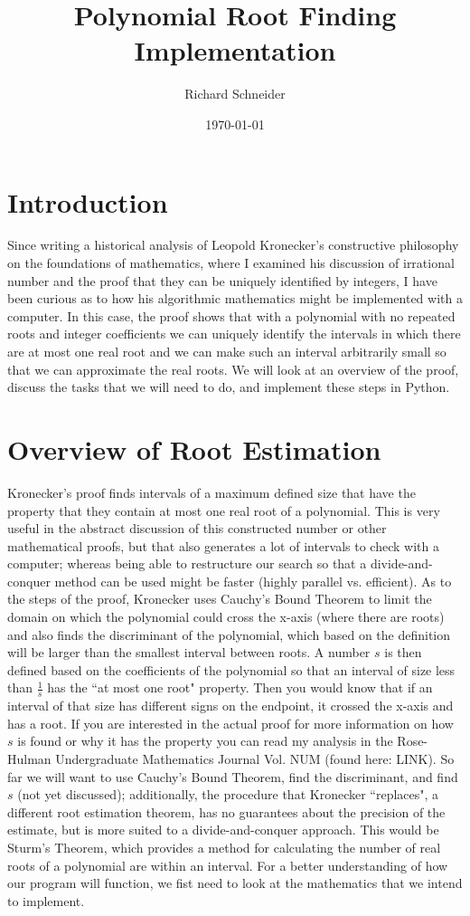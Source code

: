 \documentclass[]{article}
\title{Polynomial Root Finding Implementation}
\author{Richard Schneider}
\date{\today}
\theoremstyle{definition}
\begin{document}
\maketitle
\section{Introduction}
Since writing a historical analysis of Leopold Kronecker's constructive philosophy on the foundations of mathematics, where I examined his discussion of irrational number and the proof that they can be uniquely identified by integers, I have been curious as to how his algorithmic mathematics might be implemented with a computer. In this case, the proof shows that with a polynomial with no repeated roots and integer coefficients we can uniquely identify the intervals in which there are at most one real root and we can make such an interval arbitrarily small so that we can approximate the real roots. We will look at an overview of the proof, discuss the tasks that we will need to do, and implement these steps in Python.

\section{Overview of Root Estimation}
Kronecker's proof finds intervals of a maximum defined size that have the property that they contain at most one real root of a polynomial. This is very useful in the abstract discussion of this constructed number or other mathematical proofs, but that also generates a lot of intervals to check with a computer; whereas being able to restructure our search so that a divide-and-conquer method can be used might be faster (highly parallel vs. efficient). As to the steps of the proof, Kronecker uses Cauchy's Bound Theorem to limit the domain on which the polynomial could cross the x-axis (where there are roots) and also finds the discriminant of the polynomial, which based on the definition will be larger than the smallest interval between roots. A number $s$ is then defined based on the coefficients of the polynomial so that an interval of size less than $\frac{1}{s}$ has the ``at most one root" property. Then you would know that if an interval of that size has different signs on the endpoint, it crossed the x-axis and has a root. If you are interested in the actual proof for more information on how $s$ is found or why it has the property you can read my analysis in the Rose-Hulman Undergraduate Mathematics Journal Vol. NUM (found here: LINK). So far we will want to use Cauchy's Bound Theorem, find the discriminant, and find $s$ (not yet discussed); additionally, the procedure that Kronecker ``replaces", a different root estimation theorem, has no guarantees about the precision of the estimate, but is more suited to a divide-and-conquer approach. This would be Sturm's Theorem, which provides a method for calculating the number of real roots of a polynomial are within an interval. For a better understanding of how our program will function, we fist need to look at the mathematics that we intend to implement. 
\end{document}
